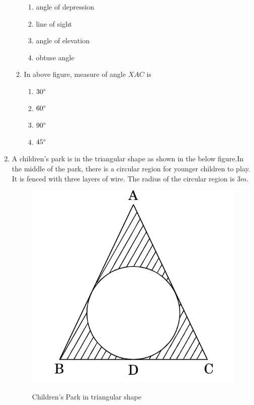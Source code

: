 \documentclass[11pt]{article}
\begin{document}
\begin{enumerate}
\begin{enumerate}[label=(\roman*)]
				\begin{enumerate}[label=(\Alph*)]
					\item angle of depression
					\item line of sight
					\item angle of elevation
					\item obtuse angle
				\end{enumerate}
			\item In above figure, measure of angle $XAC$ is
				\begin{enumerate}[label=(\Alph*)]
					\item $30\degree$
					\item $60\degree$
					\item $90\degree$
					\item $45\degree$
				\end{enumerate}
		\end{enumerate}
	\item A children's park is in the triangular shape as shown in the below figure.In the middle of the park, there is a circular region for younger children to play. It is fenced with three layers of wire. The radius of the circular region is $3 m$.
		\begin{figure}[ht!]
		\centering
		\includegraphics[width=\columnwidth]{Figs/Park.png}
		\label{fig:Park}
		\caption{Children's Park in triangular shape}
		\end{figure}

\end{enumerate}
\end{document}
